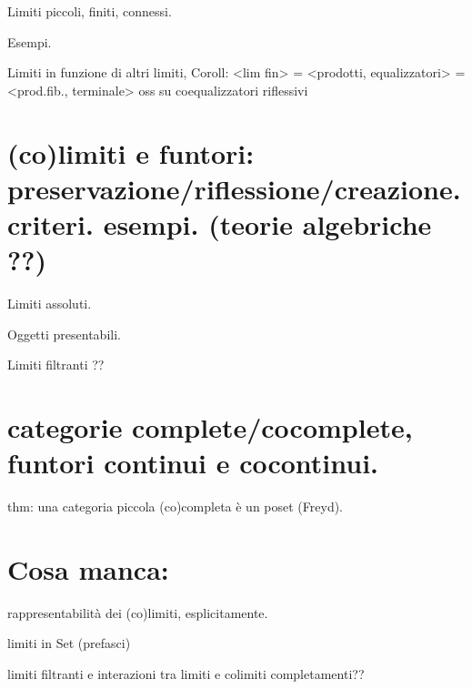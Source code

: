 Limiti piccoli, finiti, connessi.

Esempi.

Limiti in funzione di altri limiti, Coroll: <lim fin> = <prodotti, equalizzatori> = <prod.fib., terminale>
oss su coequalizzatori riflessivi



\section{(co)limiti e funtori: preservazione/riflessione/creazione. criteri. esempi. (teorie algebriche ??)}

Limiti assoluti.

Oggetti presentabili.

Limiti filtranti ??

\section{categorie complete/cocomplete, funtori continui e cocontinui.}

thm: una categoria piccola (co)completa è un poset (Freyd).

\section{Cosa manca:}

rappresentabilità dei (co)limiti, esplicitamente.

limiti in Set (prefasci)

limiti filtranti e interazioni tra limiti e colimiti
completamenti??

